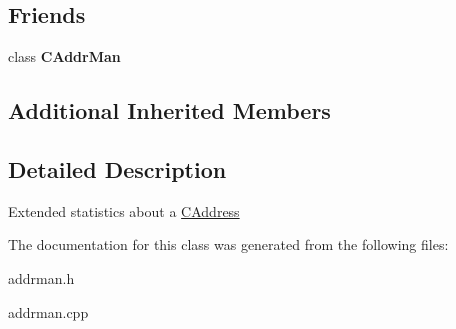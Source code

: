 \subsection*{Friends}
\begin{DoxyCompactItemize}
\item 
\mbox{\label{class_c_addr_info_a17ec4e9e560da58786d2ca36092bf83d}} 
class {\bfseries C\+Addr\+Man}
\end{DoxyCompactItemize}
\subsection*{Additional Inherited Members}


\subsection{Detailed Description}
Extended statistics about a \mbox{\hyperlink{class_c_address}{C\+Address}} 

The documentation for this class was generated from the following files\+:\begin{DoxyCompactItemize}
\item 
addrman.\+h\item 
addrman.\+cpp\end{DoxyCompactItemize}
